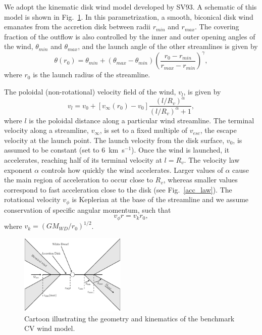\documentclass[preprint, a4paper, 11pt]{aastex}
\begin{document}
We adopt the kinematic disk wind model developed by SV93. 
A schematic of this model is shown in
Fig.~\ref{cartoon}. In this parametrization, a smooth, biconical
disk wind emanates from the accretion disk between radii $r_{min}$ and 
$r_{max}$. The covering fraction of the outflow is also controlled by the
inner and outer opening angles of the wind, $\theta_{min}$ and
$\theta_{max}$, and the launch angle of the other streamlines is given
by 
\begin{equation}
\theta(r_0) = \theta_{min} + (\theta_{max} - \theta_{min}) \left(\frac{r_0 - r_{min}}{r_{max} - r_{min}} \right)^{\gamma},
\label{theta}
\end{equation}
where $r_0$ is the launch radius of the streamline.

The poloidal (non-rotational) velocity field of the wind, $v_l$, is given by
\begin{equation}
v_l=v_0+\left[v_{\infty}(r_0)-v_0\right]\frac{\left(l/R_v\right)^{\alpha}}{\left(l/R_v\right)^{\alpha}+1},
\label{v_law}
\end{equation}
where $l$ is the poloidal distance along a particular wind
streamline. The terminal velocity along a streamline, $v_{\infty}$, is
set to a fixed multiple of $v_{esc}$, the escape velocity at the launch
point. The launch velocity from the disk surface, $v_0$, is assumed to
be constant (set to $6$~km~s$^{-1}$). Once the wind is launched, it
accelerates, reaching half of its terminal velocity at $l = R_v$. The
velocity law exponent $\alpha$ controls how quickly the wind
accelerates. Larger values of $\alpha$ cause the main region of 
acceleration to occur close to $R_v$, whereas smaller values
correspond to fast acceleration close to the disk (see
Fig.~\ref{acc_law}). The rotational velocity $v_\phi$ is 
Keplerian at the base of the streamline 
and we assume conservation of specific angular momentum,
such that
\begin{equation}
v_\phi r = v_{k} r_0,
\label{v_law}
\end{equation}
where $v_{k}=(GM_{WD}/r_0)^{1/2}$.


\begin{figure} 
\centering
\includegraphics[width=0.45\textwidth]{figures/fig2_cartoon.eps}
\caption{Cartoon illustrating the geometry and kinematics of the benchmark CV wind model.}
\label{cartoon}
\end{figure} 
\end{document}
